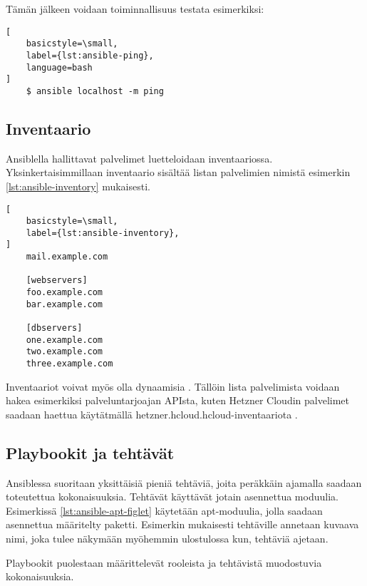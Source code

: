 Tämän jälkeen voidaan toiminnallisuus testata esimerkiksi:

\begin{lstlisting}[
    basicstyle=\small,
    label={lst:ansible-ping},
    language=bash
]
    $ ansible localhost -m ping
\end{lstlisting}

\subsection{Inventaario}

Ansiblella hallittavat palvelimet luetteloidaan inventaariossa.
Yksinkertaisimmillaan inventaario sisältää listan palvelimien nimistä
esimerkin \ref{lst:ansible-inventory} mukaisesti.
\parencite{JamesFreeman2020PA2}

\begin{lstlisting}[
    basicstyle=\small,
    label={lst:ansible-inventory},
]
    mail.example.com

    [webservers]
    foo.example.com
    bar.example.com

    [dbservers]
    one.example.com
    two.example.com
    three.example.com
\end{lstlisting}

Inventaariot voivat myös olla dynaamisia \parencite{JamesFreeman2020PA2}.
Tällöin lista palvelimista voidaan hakea esimerkiksi palveluntarjoajan APIsta,
kuten Hetzner Cloudin palvelimet saadaan haettua käytätmällä
hetzner.hcloud.hcloud-inventaariota \parencite{AnsibleDocs}.

\subsection{Playbookit ja tehtävät}

Ansiblessa suoritaan yksittäisiä pieniä tehtäviä, joita peräkkäin ajamalla
saadaan toteutettua kokonaisuuksia. Tehtävät käyttävät jotain asennettua
moduulia. \parencite{JamesFreeman2020PA2} Esimerkissä \ref{lst:ansible-apt-figlet}
käytetään apt-moduulia, jolla saadaan asennettua määritelty paketti. Esimerkin
mukaisesti tehtäville annetaan kuvaava nimi, joka tulee näkymään myöhemmin
ulostulossa kun, tehtäviä ajetaan.



Playbookit puolestaan määrittelevät rooleista ja tehtävistä muodostuvia
kokonaisuuksia. \parencite{JamesFreeman2020PA2}

